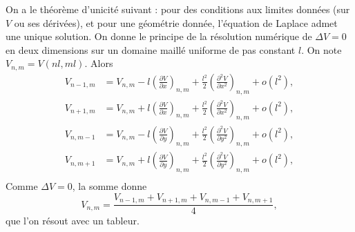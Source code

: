         On a le théorème d'unicité suivant : pour des conditions aux limites données (sur $V$ ou ses dérivées), et pour une géométrie donnée, l'équation de Laplace admet une unique solution. On donne le principe de la résolution numérique de $\Delta V=0$ en deux dimensions sur un domaine maillé uniforme de pas constant $l$. On note $V_{n,m}=V(nl,ml)$.
        Alors
        \begin{equation}
            \begin{aligned}
                V_{n-1,m}&= V_{n,m}-l\left(\frac{\partial V}{\partial x}\right)_{n,m}+\frac{l^{2}}{2}\left(\frac{\partial^{2}V}{\partial x^{2}}\right)_{n,m}+o(l^{2}),\\
                V_{n+1,m}&= V_{n,m}+l\left(\frac{\partial V}{\partial x}\right)_{n,m}+\frac{l^{2}}{2}\left(\frac{\partial^{2}V}{\partial x^{2}}\right)_{n,m}+o(l^{2}),\\
                V_{n,m-1}&= V_{n,m}-l\left(\frac{\partial V}{\partial y}\right)_{n,m}+\frac{l^{2}}{2}\left(\frac{\partial^{2}V}{\partial y^{2}}\right)_{n,m}+o(l^{2}),\\
                V_{n,m+1}&= V_{n,m}+l\left(\frac{\partial V}{\partial y}\right)_{n,m}+\frac{l^{2}}{2}\left(\frac{\partial^{2}V}{\partial y^{2}}\right)_{n,m}+o(l^{2}),\\
            \end{aligned}
        \end{equation}
        Comme $\Delta V=0$, la somme donne
        \begin{equation}
            \boxed{
                V_{n,m}=\frac{V_{n-1,m}+V_{n+1,m}+V_{n,m-1}+V_{n,m+1}}{4},
            }
        \end{equation}
        que l'on résout avec un tableur.